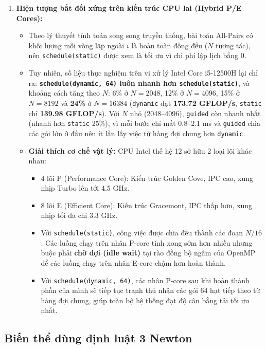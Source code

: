 \begin{enumerate}
\begin{itemize}
\end{itemize}
\item \textbf{Hiện tượng bất đối xứng trên kiến trúc CPU lai (Hybrid P/E Cores):}
\begin{itemize}
\item Theo lý thuyết tính toán song song truyền thống, bài toán All-Pairs có khối lượng mỗi vòng lặp ngoài $i$ là hoàn toàn đồng đều ($N$ tương tác), nên \texttt{schedule(static)} được xem là tối ưu vì chi phí lập lịch bằng 0.
\item Tuy nhiên, số liệu thực nghiệm trên vi xử lý Intel Core i5-12500H lại chỉ ra: \textbf{\texttt{schedule(dynamic, 64)} luôn nhanh hơn \texttt{schedule(static)}}, và khoảng cách tăng theo $N$: 6\% ở $N=2048$, 12\% ở $N=4096$, 15\% ở $N=8192$ và \textbf{24\%} ở $N=16384$ (\texttt{dynamic} đạt \textbf{173.72 GFLOP/s}, \texttt{static} chỉ \textbf{139.98 GFLOP/s}). Với $N$ nhỏ (2048--4096), \texttt{guided} còn nhanh nhất (nhanh hơn \texttt{static} 25\%), vì mỗi bước chỉ mất 0.8--2.1 ms và \texttt{guided} chia các gói lớn ở đầu nên ít lần lấy việc từ hàng đợi chung hơn \texttt{dynamic}.
\item \textbf{Giải thích cơ chế vật lý:} CPU Intel thế hệ 12 sở hữu 2 loại lõi khác nhau:
\begin{itemize}
\item 4 lõi P (Performance Core): Kiến trúc Golden Cove, IPC cao, xung nhịp Turbo lên tới 4.5 GHz.
\item 8 lõi E (Efficient Core): Kiến trúc Gracemont, IPC thấp hơn, xung nhịp tối đa chỉ 3.3 GHz.
\item Với \texttt{schedule(static)}, công việc được chia đều thành các đoạn $N/16$. Các luồng chạy trên nhân P-core tính xong sớm hơn nhiều nhưng buộc phải \textbf{chờ đợi (idle wait)} tại rào đồng bộ ngầm của OpenMP để các luồng chạy trên nhân E-core chậm hơn hoàn thành.
\item Với \texttt{schedule(dynamic, 64)}, các nhân P-core sau khi hoàn thành phần của mình sẽ tiếp tục tranh thủ nhận các gói 64 hạt tiếp theo từ hàng đợi chung, giúp toàn bộ hệ thống đạt độ cân bằng tải tối ưu nhất.
\end{itemize}
\end{itemize}
\end{enumerate}

\subsection{Biến thể dùng định luật 3 Newton}

